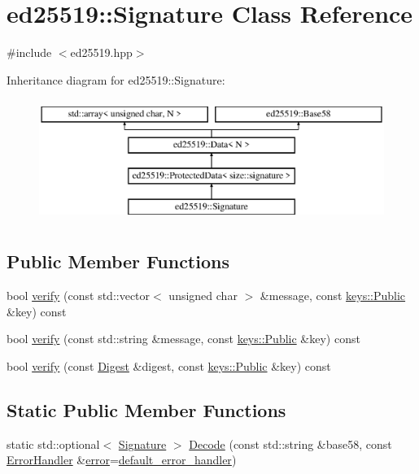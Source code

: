 \hypertarget{classed25519_1_1_signature}{}\section{ed25519\+:\+:Signature Class Reference}
\label{classed25519_1_1_signature}


{\ttfamily \#include $<$ed25519.\+hpp$>$}

Inheritance diagram for ed25519\+:\+:Signature\+:\begin{figure}[H]
\begin{center}
\leavevmode
\includegraphics[height=4.000000cm]{classed25519_1_1_signature}
\end{center}
\end{figure}
\subsection*{Public Member Functions}
\begin{DoxyCompactItemize}
\item 
bool \mbox{\hyperlink{classed25519_1_1_signature_aca2ff60a3e305730cd62e7005b92cfef}{verify}} (const std\+::vector$<$ unsigned char $>$ \&message, const \mbox{\hyperlink{classed25519_1_1keys_1_1_public}{keys\+::\+Public}} \&key) const
\item 
bool \mbox{\hyperlink{classed25519_1_1_signature_a365b186127ea5150dd233c9c89ac4faf}{verify}} (const std\+::string \&message, const \mbox{\hyperlink{classed25519_1_1keys_1_1_public}{keys\+::\+Public}} \&key) const
\item 
bool \mbox{\hyperlink{classed25519_1_1_signature_a906ffca7764e7879438a9c60d96ff207}{verify}} (const \mbox{\hyperlink{classed25519_1_1_digest}{Digest}} \&digest, const \mbox{\hyperlink{classed25519_1_1keys_1_1_public}{keys\+::\+Public}} \&key) const
\end{DoxyCompactItemize}
\subsection*{Static Public Member Functions}
\begin{DoxyCompactItemize}
\item 
static std\+::optional$<$ \mbox{\hyperlink{classed25519_1_1_signature}{Signature}} $>$ \mbox{\hyperlink{classed25519_1_1_signature_ab25f6998f84d92166a03612587420f2f}{Decode}} (const std\+::string \&base58, const \mbox{\hyperlink{namespaceed25519_a6ba572942b3c18591fc869d52a6b16e6}{Error\+Handler}} \&\mbox{\hyperlink{namespaceed25519_ac93d0b5156eaca22197055e902920bc4}{error}}=\mbox{\hyperlink{namespaceed25519_a7c7bb6ed17541162959c33ed3e3b15fb}{default\+\_\+error\+\_\+handler}})
\end{DoxyCompactItemize}
